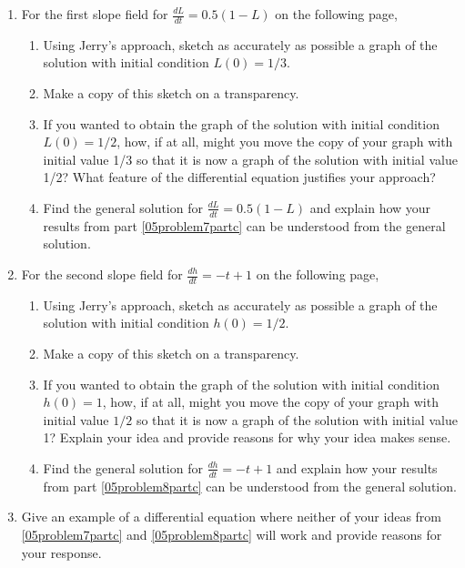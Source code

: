 \begin{enumerate}[resume]
\item For the first slope field for $\frac{dL}{dt} = 0.5(1 - L)$ on the following page,\label{05problem7}
\begin{enumerate}

\item	Using Jerry's approach, sketch as accurately as possible a graph of the solution with initial condition $L(0) = 1/3$. \label{05problem7parta}
\item	Make a copy of this sketch on a transparency. \label{05problem7partb}
\item	If you wanted to obtain the graph of the solution with initial condition $L(0) = 1/2$, how, if at all, might you move the copy of your graph with initial value 1/3 so that it is now a graph of the solution with initial value 1/2? What feature of the differential equation justifies your approach? \label{05problem7partc}
\item	Find the general solution for $\displaystyle\frac{dL}{dt} = 0.5(1-L)$ and explain how your results from part \ref{05problem7partc} can be understood from the general solution.\label{05problem7partd}
\vfill	

\end{enumerate}
\item	For the second slope field for $\frac{dh}{dt} = -t + 1$ on the following page,\label{05problem8}
\begin{enumerate}
\item	Using Jerry's approach, sketch as accurately as possible a graph of the solution with initial condition $h(0) = 1/2$. \label{05problem8parta}
\item	Make a copy of this sketch on a transparency. \label{05problem8partb}
\item	If you wanted to obtain the graph of the solution with initial condition $h(0) = 1$, how, if at all, might you move the copy of your graph with initial value $1/2$ so that it is now a graph of the solution with initial value 1? Explain your idea and provide reasons for why your idea makes sense. \label{05problem8partc}
\item	Find the general solution for $\frac{dh}{dt} = -t + 1$ and explain how your results from part \ref{05problem8partc} can be understood from the general solution. \label{05problem8partd} \vfill
\end{enumerate}

\item  Give an example of a differential equation where neither of your ideas from \ref{05problem7partc} and \ref{05problem8partc} will work and provide reasons for your response.\label{05problem9}\vfill
\end{enumerate}

